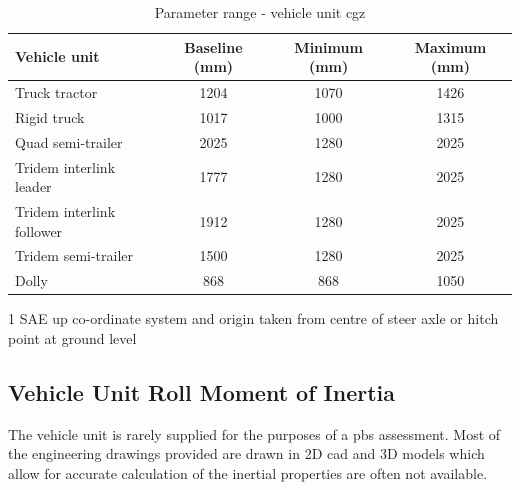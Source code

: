 \begin{table}[H]
	\centering\footnotesize
	\begin{threeparttable}

		\begin{tabulary}{\textwidth}{lccc}
			\toprule
			\textbf{Vehicle unit} & \textbf{Baseline (mm)} & \textbf{Minimum (mm)}& \textbf{Maximum (mm)} \\
			\midrule
             Truck tractor & 1204  & 1070  & 1426 \\
             Rigid truck & 1017  & 1000  & 1315 \\
             Quad semi-trailer & 2025  & 1280  & 2025 \\
             Tridem interlink leader & 1777  & 1280  & 2025 \\
             Tridem interlink follower & 1912  & 1280  & 2025 \\
             Tridem semi-trailer & 1500  & 1280  & 2025 \\
			 Dolly & 868 & 868 & 1050 \\
			\bottomrule
		\end{tabulary}

		\caption{Parameter range - vehicle unit \gls{cgz}}
		\label{table:parameter-range-cgz}

		\begin{tablenotes}
			\item[1] SAE up co-ordinate system and origin taken from centre of steer axle or hitch point at ground level
		\end{tablenotes}

	\end{threeparttable}
\end{table}

\subsection{Vehicle Unit Roll Moment of Inertia}\label{section:pr-roll-moment-of-inertia-vehicle-units}

The vehicle unit  is rarely supplied for the purposes of a \gls{pbs} assessment. Most of the engineering drawings provided are drawn in 2D \gls{cad} and 3D models which allow for accurate calculation of the inertial properties are often not available.

